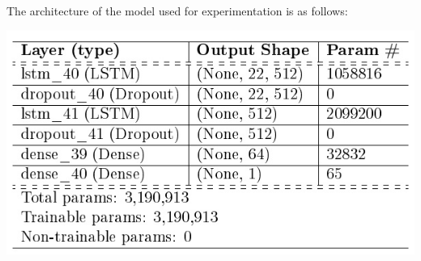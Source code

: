 The architecture of the model used for experimentation is as follows:

				\begin{center}
				\includegraphics[width=\linewidth]{figures/architecture-of-LSTM.jpg}	%
				\label{fig: The architecture of the LSTM model}
				\end{center}





